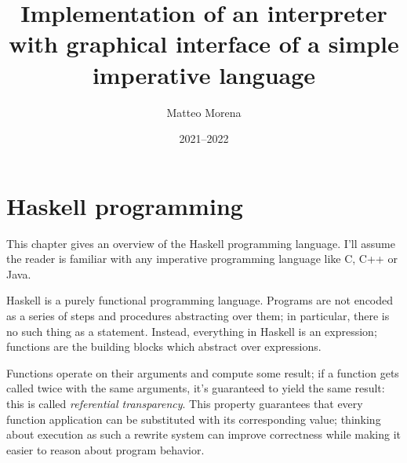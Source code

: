 \documentclass[UdineBachThesis,american,11pt]{PhdThesis}
\author{Matteo Morena}
\date{2021--2022}
\title{
  Implementation of an interpreter with graphical interface of a simple
  imperative language
}
\begin{document}
  \pagestyle{empty}

  \maketitle

  \cleardoublepage


  \begin{abstract}
  \end{abstract}


  \begin{acknowledgments}
  \end{acknowledgments}

  \frontmatter


  \tableofcontents

  \mainmatter

  \pagestyle{serif}

  \chapter{Haskell programming}

  This chapter gives an overview of the Haskell programming language. I'll
  assume the reader is familiar with any imperative programming language like C,
  C++ or Java.

  Haskell is a purely functional programming language. Programs are not encoded
  as a series of steps and procedures abstracting over them; in particular,
  there is no such thing as a statement. Instead, everything in Haskell is an
  expression; functions are the building blocks which abstract over expressions.

  Functions operate on their arguments and compute some result; if a function
  gets called twice with the same arguments, it's guaranteed to yield the same
  result: this is called \emph{referential transparency}. This property
  guarantees that every function application can be substituted with its
  corresponding value; thinking about execution as such a rewrite system can
  improve correctness while making it easier to reason about program behavior.
\end{document}

